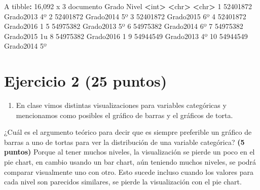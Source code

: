 \documentclass[
]{article}
\newenvironment{Shaded}{\begin{snugshade}}{\end{snugshade}}
\newcommand{\CommentTok}[1]{\textcolor[rgb]{0.56,0.35,0.01}{\textit{#1}}}
\newcommand{\DecValTok}[1]{\textcolor[rgb]{0.00,0.00,0.81}{#1}}
\newcommand{\ErrorTok}[1]{\textcolor[rgb]{0.64,0.00,0.00}{\textbf{#1}}}
\newcommand{\KeywordTok}[1]{\textcolor[rgb]{0.13,0.29,0.53}{\textbf{#1}}}
\newcommand{\NormalTok}[1]{#1}
\newcommand{\OperatorTok}[1]{\textcolor[rgb]{0.81,0.36,0.00}{\textbf{#1}}}
\newcommand{\StringTok}[1]{\textcolor[rgb]{0.31,0.60,0.02}{#1}}
\providecommand{\tightlist}{%
  \setlength{\itemsep}{0pt}\setlength{\parskip}{0pt}}
\begin{document}
\begin{Shaded}
\end{Shaded}

\begin{Shaded}
\begin{Highlighting}[]
\NormalTok{A tibble}\OperatorTok{:}\StringTok{ }\DecValTok{16}\NormalTok{,}\DecValTok{092}\NormalTok{ x }\DecValTok{3}
\NormalTok{   documento  Grado   Nivel}
       \OperatorTok{<}\NormalTok{int}\OperatorTok{>}\StringTok{  }\ErrorTok{<}\NormalTok{chr}\OperatorTok{>}\StringTok{   }\ErrorTok{<}\NormalTok{chr}\OperatorTok{>}
\StringTok{ }\DecValTok{1}  \DecValTok{52401872}\NormalTok{ Grado2013 4º   }
 \DecValTok{2}  \DecValTok{52401872}\NormalTok{ Grado2014 5º   }
 \DecValTok{3}  \DecValTok{52401872}\NormalTok{ Grado2015 6º   }
 \DecValTok{4}  \DecValTok{52401872}\NormalTok{ Grado2016 }\DecValTok{1}    
 \DecValTok{5}  \DecValTok{54975382}\NormalTok{ Grado2013 5º   }
 \DecValTok{6}  \DecValTok{54975382}\NormalTok{ Grado2014 6º   }
 \DecValTok{7}  \DecValTok{54975382}\NormalTok{ Grado2015 1u   }
 \DecValTok{8}  \DecValTok{54975382}\NormalTok{ Grado2016 }\DecValTok{1}    
 \DecValTok{9}  \DecValTok{54944549}\NormalTok{ Grado2013 4º   }
\DecValTok{10}  \DecValTok{54944549}\NormalTok{ Grado2014 5º   }
\end{Highlighting}
\end{Shaded}

\hypertarget{ejercicio-2-25-puntos}{%
\section{Ejercicio 2 (25 puntos)}\label{ejercicio-2-25-puntos}}

\begin{enumerate}
\def\labelenumi{\arabic{enumi}.}
\tightlist
\item
  En clase vimos distintas visualizaciones para variables categóricas y
  mencionamos como posibles el gráfico de barras y el gráficos de torta.
\end{enumerate}

¿Cuál es el argumento teórico para decir que es siempre preferible un
gráfico de barras a uno de tortas para ver la distribución de una
variable categórica? \textbf{(5 puntos)} Porque al tener muchos niveles,
la visualización se pierde un poco en el pie chart, en cambio usando un
bar chart, aún teniendo muchos niveles, se podrá comparar visualmente
uno con otro. Esto sucede incluso cuando los valores para cada nivel son
parecidos similares, se pierde la visualización con el pie chart.
\end{document}

